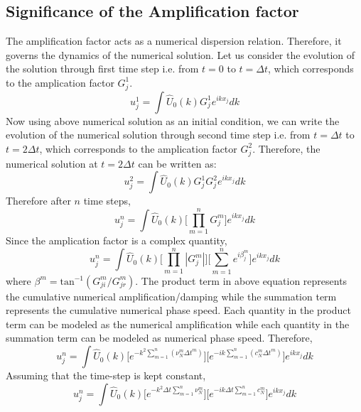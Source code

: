 \documentclass[fleqn]{article}
\begin{document}
\subsection{Significance of the Amplification factor}
The amplification factor acts as a numerical dispersion relation. Therefore, it governs the dynamics of the numerical solution. Let us consider the evolution of the solution through first time step i.e. from $t=0$ to $t=\Delta t$, which corresponds to the amplication factor $G_j^1$.
\begin{equation*}
u_j^1 = \int \hat{U}_0(k) G_j^1 e^{i k x_j} dk
\end{equation*}
Now using above numerical solution as an initial condition, we can write the evolution of the numerical solution through second time step i.e. from $t=\Delta t$ to $t=2\Delta t$, which corresponds to the amplication factor $G_j^2$. Therefore, the numerical solution at $t = 2\Delta t$ can be written as:
\begin{equation*}
u_j^2 = \int \hat{U}_0(k) G_j^1 G_j^2 e^{i k x_j} dk
\end{equation*} 
Therefore after $n$ time steps,
\begin{equation*}
u_j^n = \int \hat{U}_0(k) \Big[ \prod\limits_{m=1}^{n} G_j^m \Big] e^{i k x_j} dk
\end{equation*} 
Since the amplication factor is a complex quantity,
\begin{equation*}
u_j^n = \int \hat{U}_0(k) \Bigg[ \prod\limits_{m=1}^{n} |G_j^m| \Bigg] \Bigg[ \sum\limits_{m=1}^{n} e^{i \beta_j^m} \Bigg] e^{i k x_j} dk
\end{equation*}
where $\beta^m = \text{tan}^{-1}(G_{ji}^m/G_{jr}^m)$. The product term in above equation represents the cumulative numerical amplification/damping while the summation term represents the cumulative numerical phase speed. Each quantity in the product term can be modeled as the numerical amplification while each quantity in the summation term can be modeled as numerical phase speed. Therefore,
\begin{equation*}
u_j^n = \int \hat{U}_0(k) \Bigg[  e^{-k^2 \sum\limits_{m=1}^{n}(\nu_N^m \Delta t^m)} \Bigg] \Bigg[ e^{-i k \sum\limits_{m=1}^{n} (c_N^m \Delta t^m)} \Bigg] e^{i k x_j} dk
\end{equation*}
Assuming that the time-step is kept constant,
\begin{equation*}
u_j^n = \int \hat{U}_0(k) \Bigg[  e^{-k^2 \Delta t \sum\limits_{m=1}^{n}\nu_N^m} \Bigg] \Bigg[ e^{-i k \Delta t \sum\limits_{m=1}^{n} c_N^m} \Bigg] e^{i k x_j} dk
\end{equation*}
\end{document}
